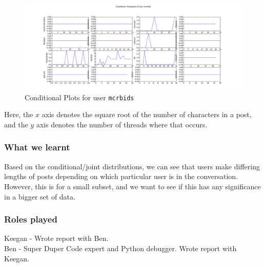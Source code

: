 \documentclass[a4paper,12pt]{article}
\numberwithin{equation}{section}
\begin{document}
\begin{figure}[here!]
\begin{center}
\includegraphics[angle = 90, scale=0.46]{mcrbids.png}
\caption{Conditional Plots for user {\tt mcrbids}}
\end{center}
\end{figure}

Here, the $x$ axis denotes the square root of the number of characters in a post, and the $y$ axis denotes the number of threads where that occurs.


\subsubsection*{What we learnt}


Based on the conditional/joint distributions, we can see that users make differing lengths of posts depending on which particular user is in the conversation. However, this is for a small subset, and we want to see if this has any significance in a bigger set of data. 

\subsubsection*{Roles played}

Keegan - Wrote report with Ben.  \\
Ben - Super Duper Code expert and Python debugger. Wrote report with Keegan.

\clearpage

	
\end{document}

